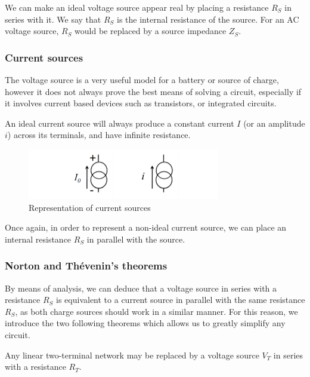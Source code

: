 \documentclass{article}
\begin{document}
We can make an ideal voltage source appear real by placing a resistance $R_S$ in series with it. We say that $R_S$ is the internal resistance of the source. For an AC voltage source, $R_S$ would be replaced by a source impedance $Z_S$.

\subsubsection{Current sources}

The voltage source is a very useful model for a battery or source of charge, however it does not always prove the best means of solving a circuit, especially if it involves current based devices such as transistors, or integrated circuits.

\begin{definition}
    An ideal current source will always produce a constant current $I$ (or an amplitude $i$) across its terminals, and have infinite resistance.
\end{definition}

\begin{figure}[h]
    \centering
    \includegraphics[width=0.75\textwidth]{images/currentsource.png}
    \caption{Representation of current sources}
    \label{fig:current-sources}
\end{figure}

Once again, in order to represent a non-ideal current source, we can place an internal resistance $R_S$ in parallel with the source.

\subsubsection{Norton and Thévenin's theorems}

By means of analysis, we can deduce that a voltage source in series with a resistance $R_S$ is equivalent to a current source in parallel with the same resistance $R_S$, as both charge sources should work in a similar manner. For this reason, we introduce the two following theorems which allows us to greatly simplify any circuit.

\begin{theorem}
    Any linear two-terminal network may be replaced by a voltage source $V_{T}$ in series with a resistance $R_{T}$.
\end{theorem}
\end{document}

